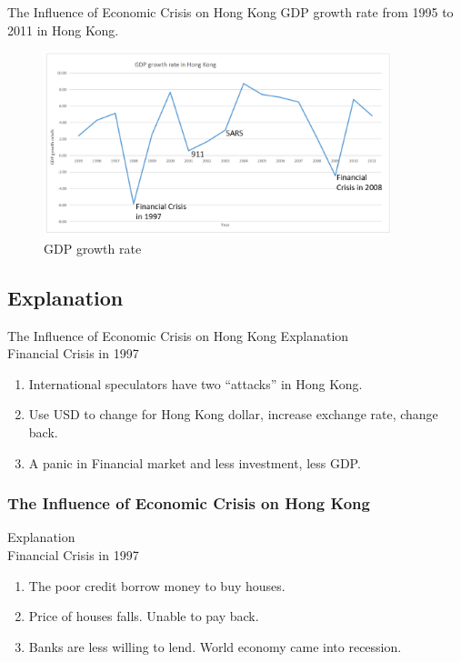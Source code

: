 \documentclass[slidestop,uncompress,mathsans, 12pt]{beamer}
\begin{document}
\begin{frame}{The Influence of Economic Crisis on Hong Kong }
GDP growth rate from 1995 to 2011 in Hong Kong.\\
\bigskip
\begin{figure}[h]
\raggedleft
\includegraphics[width=0.9\textwidth]{hk23.png}
\caption{GDP growth rate}
\label{threadsVsSync}
\end{figure}
\end{frame}

\subsection{Explanation}
\begin{frame}{The Influence of Economic Crisis on Hong Kong }
Explanation\\
\bigskip
\alert{Financial Crisis in 1997}
\bigskip

\begin{enumerate}[i]
\pause\item International speculators have two “attacks” in Hong Kong.
\bigskip
\pause\item Use USD to change for Hong Kong dollar, increase exchange rate, change back.
\bigskip
\pause\item A panic in Financial market and less investment, less GDP.
\end{enumerate}

\end{frame}

\begin{frame}
\frametitle{The Influence of Economic Crisis on Hong Kong }
Explanation\\
\bigskip
\alert{Financial Crisis in 1997}
\bigskip
\begin{enumerate}[I]
\item <+-| alert@+> The poor credit borrow money to buy houses.

\bigskip
\item <+-| alert@+> Price of houses falls. Unable to pay back.

\bigskip
\item <+-| alert@+> Banks are less willing to lend. World economy came into recession.


\bigskip

\end{enumerate}
\end{frame}
\end{document}
